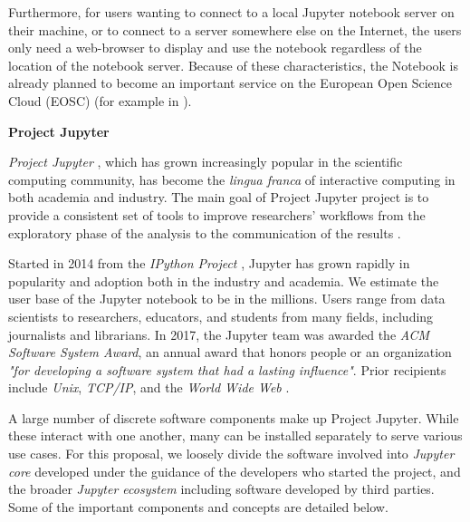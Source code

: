 Furthermore, for users wanting to connect
to a local Jupyter notebook server on their machine, or to connect to
a server somewhere else on the Internet, the users only need a
web-browser to display and use the notebook regardless of the location
of the notebook server. Because of these
characteristics, the Notebook is already planned to become an
important service on the European Open Science Cloud (EOSC) (for
example in \cite{panosc}).

\medskip\noindent\textbf{Project Jupyter}

\emph{Project Jupyter} \cite{Jupyter}, which has grown increasingly popular in the scientific
computing community, has become the \emph{lingua franca} of interactive
computing in both academia and industry. The main goal of Project Jupyter
project is to provide a consistent set of tools to improve researchers'
workflows from the exploratory phase of the analysis to the communication
of the results \cite{Kluyver2016}.

Started in 2014 from the \emph{IPython Project} \cite{IPython}, Jupyter has grown rapidly in
popularity and adoption both in the industry and academia. We estimate the user
base of the Jupyter notebook to be in the millions. Users range from data
scientists to researchers, educators, and students from many fields,
including journalists and librarians. In 2017, the Jupyter
team was awarded the \emph{ACM Software System Award}, an annual award that
honors people or an organization \emph{"for developing a software system that had a
lasting influence"}. Prior recipients include \emph{Unix}, \emph{TCP/IP}, and
the \emph{World Wide Web} \cite{acm-award}.

A large number of discrete software components make up Project Jupyter.
While these interact with one another, many can be installed separately
to serve various use cases. For this proposal, we loosely divide the
software involved into \emph{Jupyter core} developed under the guidance
of the developers who started the project, and the broader \emph{Jupyter
ecosystem} including software developed by third parties. Some of the
important components and concepts are detailed below.

